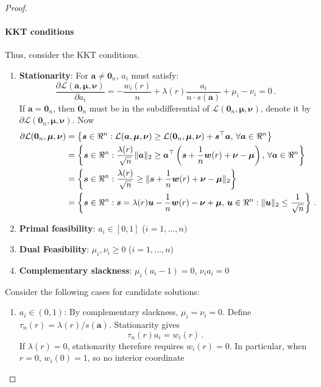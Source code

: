 \documentclass{article}
\makeatletter
\theoremstyle{definition}
\newcommand{\vnorm}[1]{%
	\ensuremath{%
		\if@display
		\left\| #1 \right\|
		\else
		\| #1 \|
		\fi
	}%
}
\newcommand*{\bb}{\boldsymbol}
\def\bu{\bb{u}}
\makeatother
\begin{document}
\begin{bibunit}
\begin{proof}
	\paragraph*{KKT conditions}
	Thus, consider the KKT conditions.
	\begin{enumerate}
		\item \textbf{Stationarity}: For $\bb a \neq \bb 0_n$, $a_i$ must satisfy:
		$$
		\frac{\partial \mathcal{L}(\bb a, \bb{\mu}, \bb{\nu})}{\partial a_i} = -\frac{w_i(r)}{n} + \lambda(r) \frac{a_i}{n \cdot s(\bb a)} + \mu_i - \nu_i = 0 \,.
		$$
		If $\bb a= \bb 0_n$, then $\bb 0_n$ must be in the subdifferential of $\mathcal{L}(\bb 0_n, \bb \mu, \bb \nu)$, denote it by $\partial \mathcal{L}(\bb 0_n, \bb \mu, \bb \nu)$.
		Now
		$$
			\begin{aligned}
				\partial \mathcal{L}(\bb 0_n, \bb \mu, \bb \nu) &= \left\{\bb s \in \Re^n: \mathcal{L}(\bb a, \bb \mu, \bb \nu) \geq \mathcal{L}(\bb 0_n, \bb \mu, \bb \nu) + \bb s^\top \bb a, \, \forall \bb a \in \Re^n \right\} \\
				&= \left\{\bb s \in \Re^n: \frac{\lambda(r)}{\sqrt{n}} \vnorm{\bb a}_2 \geq \bb a^\top \left( \bb s + \frac{1}{n} \bb w(r) + \bb \nu - \bb \mu \right),  \, \forall \bb a \in \Re^n \right\} \\
				&= \left\{\bb s \in \Re^n: \frac{\lambda(r)}{\sqrt{n}} \geq \vnorm{\bb s + \frac{1}{n} \bb w(r) + \bb \nu - \bb \mu}_2 \right\} \\
				&= \left\{\bb s \in \Re^n: \bb s = \lambda(r) \bu - \frac{1}{n} \bb w(r) - \bb \nu + \bb \mu, \, \bb{u} \in \Re^n: \vnorm{\bu}_2 \leq \frac{1}{\sqrt{n}}   \right\}\,.
			\end{aligned}
		$$
		\item \textbf{Primal feasibility}: $a_i \in [0,1]$ ($i = 1, \ldots, n)$
		\item \textbf{Dual Feasibility}: $\mu_i, \nu_i \geq 0$ ($i = 1, \ldots, n)$
		\item \textbf{Complementary slackness}: $\mu_i (a_i - 1) = 0$, $\nu_i a_i = 0$
	\end{enumerate}
	Consider the following cases for candidate solutions:
	\begin{enumerate}[label=(\roman{*})]
\item 
		$a_i\in(0,1)$: By complementary slackness,
		$\mu_i=\nu_i=0$. Define $\tau_n(r)=\lambda(r)/s(\bb a)$.
		Stationarity gives
		$$
		\tau_n(r)a_i=w_i(r) \,.
		$$
		If $\lambda(r)=0$, stationarity therefore requires $w_i(r)=0$.
		In particular, when $r=0$, $w_i(0)=1$, so no interior coordinate

\end{enumerate}
\end{proof}
\end{bibunit}
\end{document}
